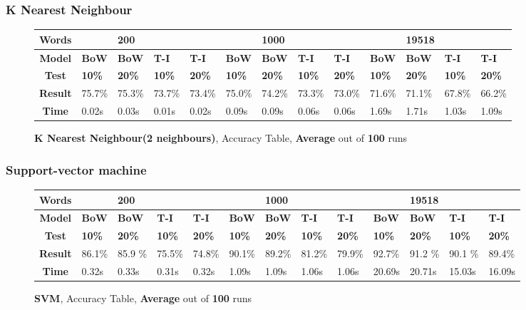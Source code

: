 \documentclass{article}
\begin{document}
	\subsubsection{K Nearest Neighbour}
	\begin{figure}[!h]
		\begin{tabular}{||c||l|l|l|l||l|l|l|l||l|l|l|l||}
			\hline
			\textbf{Words} &  & \textbf{200} & & & &\textbf{1000} & & & & \textbf{19518} &  & \\ \hline 
			\textbf{Model} & \textbf{BoW} & \textbf{BoW} & \textbf{T-I} & \textbf{T-I} &\textbf{BoW} & \textbf{BoW} & \textbf{T-I} & \textbf{T-I} & \textbf{BoW} & \textbf{BoW} & \textbf{T-I} & \textbf{T-I}\\ \hline
			\textbf{Test} & \textbf{10\%} & \textbf{20\%} & \textbf{10\%} & \textbf{20\%} & \textbf{10\%} & \textbf{20\%} & \textbf{10\%} & \textbf{20\%} & \textbf{10\%} & \textbf{20\%} & \textbf{10\%} & \textbf{20\%} \\ \hline \hline  
			\textbf{Result} & 75.7\% & 75.3\% & 73.7\% & 73.4\% & 75.0\% & 74.2\% & 73.3\% & 73.0\% & 71.6\% & 71.1\% & 67.8\% & 66.2\% \\ \hline 
			\textbf{Time} &0.02s & 0.03s & 0.01s & 0.02s & 0.09s & 0.09s & 0.06s & 0.06s & 1.69s & 1.71s & 1.03s & 1.09s \\ \hline 
		\end{tabular}
		\caption{\textbf{K Nearest Neighbour(2 neighbours)}, Accuracy Table, \textbf{Average} out of \textbf{100} runs}
	\end{figure}

	\subsubsection{Support-vector machine}
	\begin{figure}[!h]
		\begin{tabular}{||c||l|l|l|l||l|l|l|l||l|l|l|l||}
			\hline
			\textbf{Words} &  & \textbf{200} & & & &\textbf{1000} & & & & \textbf{19518} &  & \\ \hline 
			\textbf{Model} & \textbf{BoW} & \textbf{BoW} & \textbf{T-I} & \textbf{T-I} &\textbf{BoW} & \textbf{BoW} & \textbf{T-I} & \textbf{T-I} & \textbf{BoW} & \textbf{BoW} & \textbf{T-I} & \textbf{T-I}\\ \hline
			\textbf{Test} & \textbf{10\%} & \textbf{20\%} & \textbf{10\%} & \textbf{20\%} & \textbf{10\%} & \textbf{20\%} & \textbf{10\%} & \textbf{20\%} & \textbf{10\%} & \textbf{20\%} & \textbf{10\%} & \textbf{20\%} \\ \hline \hline  
			\textbf{Result} & 86.1\% &85.9 \% & 75.5\% & 74.8\% &90.1\% &89.2\% &81.2\% & 79.9\% & 92.7\% &91.2 \% &90.1 \% &89.4\% \\ \hline  
			\textbf{Time} &0.32s & 0.33s & 0.31s & 0.32s & 1.09s & 1.09s & 1.06s & 1.06s & 20.69s & 20.71s & 15.03s & 16.09s \\ \hline 
		\end{tabular}
		\caption{\textbf{SVM}, Accuracy Table, \textbf{Average} out of \textbf{100} runs}
	\end{figure}
\end{document}
